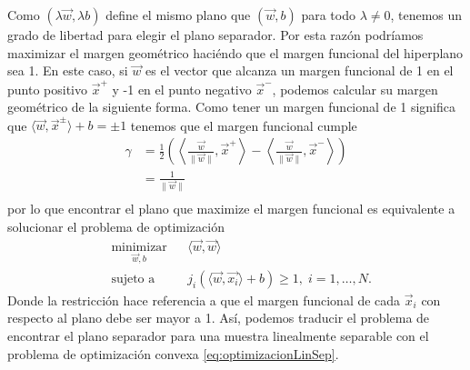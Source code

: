 \documentclass[letterpaper,12pt]{book}
\begin{document}
Como $(\lambda\vec{w}, \lambda b)$ define el mismo plano que $(\vec{w}, b)$  para todo $\lambda \neq 0$, tenemos un grado de libertad para elegir el plano separador. Por esta razón podríamos maximizar el margen geométrico haciéndo que el margen funcional del hiperplano sea 1. En este caso, si $\vec{w}$ es el vector que alcanza un margen funcional de 1 en el punto positivo $\vec{x}^+$ y -1 en el punto negativo $\vec{x}^-$, podemos calcular su margen geométrico de la siguiente forma. Como tener un margen funcional de 1 significa que $\langle \vec{w}, \vec{x}^{\pm}\rangle +b = \pm 1$ tenemos que el margen funcional cumple
\begin{equation}
  \begin{aligned}
    \gamma &=\frac{1}{2}\left(\left\langle\frac{\vec{w}}{\|\vec{w}\|},\vec{x}^+\right\rangle-\left\langle\frac{\vec{w}}{\|\vec{w}\|},\vec{x}^-\right\rangle\right) \\
    & = \frac{1}{\|\vec{w}\|}\\ 
  \end{aligned}
\end{equation}
por lo que encontrar el plano que maximize el margen funcional es equivalente a solucionar el problema de optimización
\begin{equation}\label{eq:optimizacionLinSep}
\begin{aligned}
& \underset{\vec{w},b}{\text{minimizar}}
& & \langle \vec{w}, \vec{w} \rangle \\
& \text{sujeto a}
& & j_i(\langle \vec{w}, \vec{x_i}\rangle + b)\geq 1, \; i = 1, \ldots, N.
\end{aligned}
\end{equation}
Donde la restricción hace referencia a que el margen funcional de cada $\vec{x}_i$ con respecto al plano debe ser mayor a 1. Así, podemos traducir el problema de encontrar el plano separador para una muestra linealmente separable con el problema de optimización convexa \ref{eq:optimizacionLinSep}.
\end{document}
